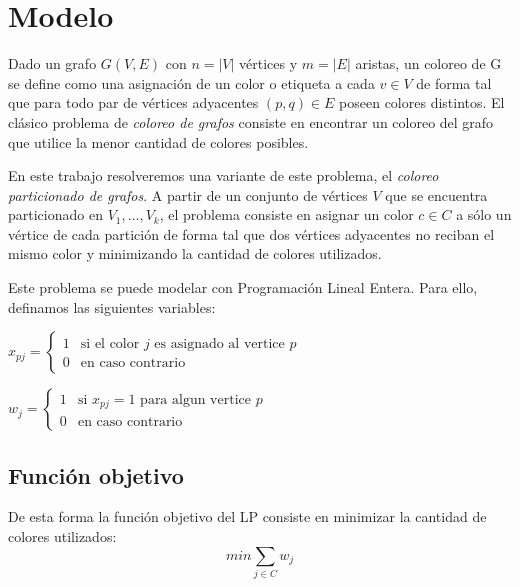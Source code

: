 \section{Modelo}

Dado un grafo $G(V,E)$ con $n = |V|$ vértices y $m = |E|$ aristas,  un coloreo de G se define como una asignación de un color o etiqueta a cada $v \in V$ de forma tal que para todo  par de vértices adyacentes $(p,q) \in E$ poseen colores distintos. El clásico problema de \textit{coloreo de grafos} consiste en encontrar un coloreo del grafo que utilice la menor cantidad de colores posibles.

En este trabajo resolveremos una variante de este problema, el \textit{coloreo particionado de grafos}. A partir de un conjunto de vértices $V$ que se encuentra particionado en $V_1,...,V_k$, el problema consiste en asignar un color $c \in C$ a sólo un vértice de cada partición de forma tal que dos vértices adyacentes no reciban el mismo color y minimizando la cantidad de colores utilizados.

Este problema se puede modelar con Programación Lineal Entera. Para ello, definamos las siguientes variables:

\hspace{1px}

\begin{center}
$x_{pj} = \begin{cases}
  1 & \text{si el color $j$ es asignado al vertice $p$} \\
  0 & \text{en caso contrario}
\end{cases}$

\hspace{1px}

$w_j = \begin{cases}
  1 & \text{si $x_{pj} = 1$ para algun vertice $p$} \\
  0 & \text{en caso contrario}
\end{cases}$
\end{center}

\subsection{Función objetivo}

De esta forma la función objetivo del LP consiste en minimizar la cantidad de colores utilizados:
\begin{equation}
min \sum_{j \in C} w_j
\end{equation}

